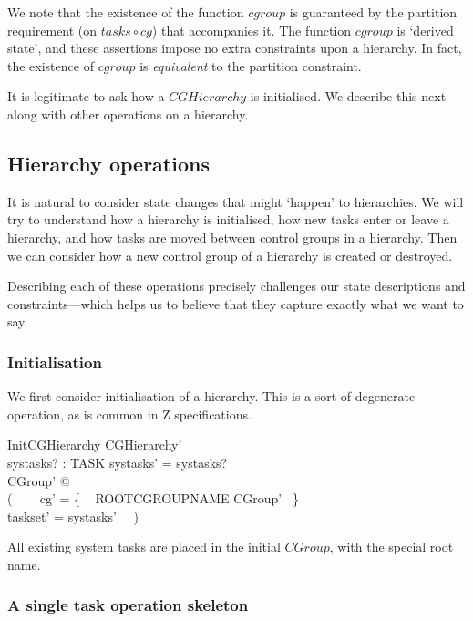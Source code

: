 \documentclass[a4paper,twoside,12pt]{article}
\begin{document}
We note that the existence of the function $cgroup$ is guaranteed by the partition requirement
(on $tasks \circ cg$) that accompanies it.
The function $cgroup$ is `derived state', and these assertions impose no extra constraints upon a hierarchy.
In fact, the existence of $cgroup$ is \emph{equivalent} to the partition constraint.

It is legitimate to ask how a $CGHierarchy$ is initialised.
We describe this next along with other operations on a hierarchy.


\subsection{Hierarchy operations}

It is natural to consider state changes that might `happen' to hierarchies.
We will try to understand how a hierarchy is initialised, how new tasks enter or leave a hierarchy,
and how tasks are moved between control groups in a hierarchy.
Then we can consider how a new control group of a hierarchy is created or destroyed.

Describing each of these operations precisely challenges our state descriptions and constraints---which helps us
to believe that they capture exactly what we want to say.

\subsubsection{Initialisation}

We first consider initialisation of a hierarchy. This is a sort of degenerate operation, as is common in Z specifications.

\begin{schema}{InitCGHierarchy}
CGHierarchy' \\
systasks? : \finset TASK
\where
systasks' = systasks? \\
\exists CGroup' @ \\
( ~~~ cg' = \{ ~ ROOTCGROUPNAME \mapsto \theta CGroup' ~\} \\
\land taskset' = systasks' ~~)
\end{schema}
All existing system tasks are placed in the initial $CGroup$,
with the special root name.

\subsubsection{A single task operation skeleton}
\end{document}
